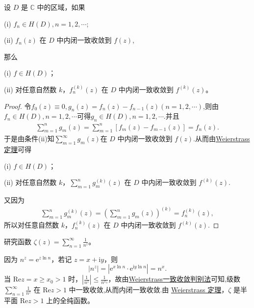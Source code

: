 \documentclass[../../main.tex]{subfiles}%
\begin{document}
\begin{corollary}\label{corollary:复变函数--函数项级数Weierstrass定理推论}
设 \( D \) 是 \( \mathbb{C} \) 中的区域，如果

(i) \( f_n \in H(D), n = 1, 2, \cdots \);

(ii) \( f_n(z) \) 在 \( D \) 中内闭一致收敛到 \( f(z) \),

那么

(i) \( f \in H(D) \)；

(ii) 对任意自然数 \( k \)，\( f_n^{(k)}(z) \) 在 \( D \) 中内闭一致收敛到 \( f^{(k)}(z) \)。
\end{corollary}
\begin{proof}

令$f_0(z)\equiv 0,g_n(z)=f_{n}(z)-f_{n-1}(z)(n=1,2,\cdots)$,则由$f_n\in H(D),n=1,2,\cdots$可得$g_n\in H(D),n=1,2,\cdots.$并且
\begin{align*}
\sum_{m=1}^n{g_m\left( z \right)}=\sum_{m=1}^n{\left[ f_m\left( z \right) -f_{m-1}\left( z \right) \right]}=f_n\left( z \right) .
\end{align*}
于是由条件(ii)知$\sum_{m=1}^{\infty}{g_m\left( z \right)}$在 \( D \) 中内闭一致收敛到 \( f(z) \).从而由\hyperref[theorem:Weierstrass定理]{Weierstrass定理}可得

(i) \( f \in H(D) \)；

(ii) 对任意自然数 \( k \)，\( \sum_{m=1}^{n} g_m^{(k)}(z) \) 在 \( D \) 中内闭一致收敛到 \( f^{(k)}(z) \).

又因为
\begin{align*}
\sum_{m=1}^n{g_{m}^{\left( k \right)}\left( z \right)}=\left( \sum_{m=1}^n{g_m\left( z \right)} \right) ^{\left( k \right)}=f_{n}^{\left( k \right)}\left( z \right) ,
\end{align*}
所以对任意自然数 \( k \)，\( f_{n}^{\left( k \right)}\left( z \right) \) 在 \( D \) 中内闭一致收敛到 \( f^{(k)}(z) \).

\end{proof}

\begin{example}
研究函数 \( \zeta(z) = \sum_{n=1}^{\infty} \frac{1}{n^z} \)。
\end{example}
\begin{solution}

因为 \( n^z = \mathrm{e}^{z \ln n} \)，若记 \( z = x + \mathrm{i}y \)，则
\[
|n^z| = |\mathrm{e}^{x \ln n} \cdot \mathrm{e}^{\mathrm{i}y \ln n}| = n^x.
\]
当 \( \mathrm{Re}z = x \geqslant x_0 > 1 \) 时，\( \left| \frac{1}{n^z} \right| \leqslant \frac{1}{n^{x_0}} \)，故由\hyperref[theorem:Weierstrass一致收敛判别法]{Weierstrass一致收敛判别法}可知,级数 \( \sum_{n=1}^{\infty} \frac{1}{n^z} \) 在 \( \mathrm{Re}z > 1 \) 中一致收敛,从而内闭一致收敛.由 \hyperref[theorem:Weierstrass定理]{Weierstrass 定理}，\( \zeta \) 是半平面 \( \mathrm{Re}z > 1 \) 上的全纯函数。

\end{solution}
\end{document}
